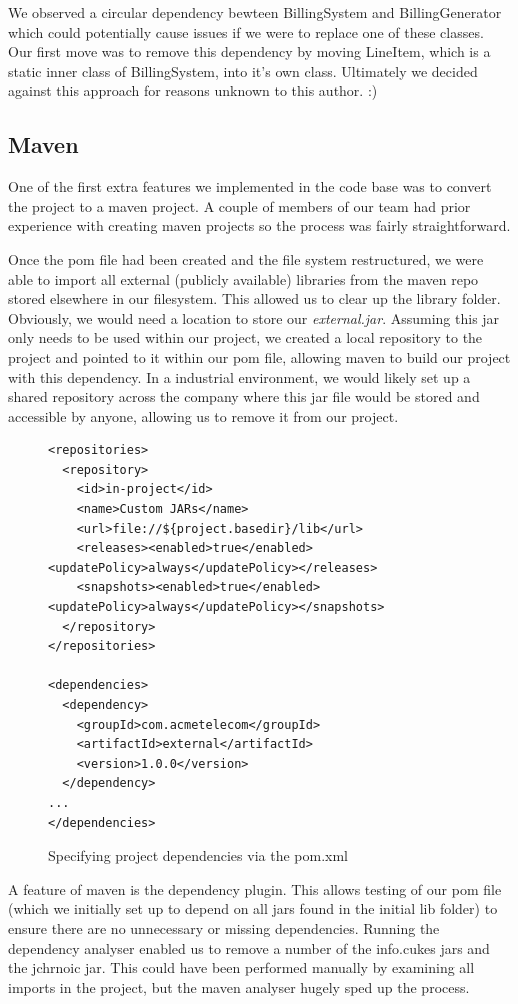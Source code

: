 \documentclass[a4paper]{article}
\begin{document}
We observed a circular dependency bewteen BillingSystem and BillingGenerator which
could potentially cause issues if we were to replace one of these classes. Our
first move was to remove this dependency by moving LineItem, which is a static inner class
of BillingSystem, into it's own class. Ultimately we decided against this approach
for reasons unknown to this author. :)


\subsection{Maven}

One of the first extra features we implemented in the code base was to
convert the project to a maven project. A couple of members of our team
had prior experience with creating maven projects so the process was fairly
straightforward. 

Once the pom file had been created and the file system restructured, we were
able to import all external (publicly available) libraries from the maven repo
stored elsewhere in our filesystem. This allowed us to clear up the library folder.
Obviously, we would need a location to store our \emph{external.jar}. Assuming this
jar only needs to be used within our project, we created a local repository to
the project and pointed to it within our pom file, allowing maven to build our
project with this dependency. In a industrial environment, we would likely set
up a shared repository across the company where this jar file would be stored
and accessible by anyone, allowing us to remove it from our project.

\begin{figure}[h]
\begin{verbatim}  
<repositories>
  <repository>
    <id>in-project</id>
    <name>Custom JARs</name>
    <url>file://${project.basedir}/lib</url>
    <releases><enabled>true</enabled><updatePolicy>always</updatePolicy></releases>
    <snapshots><enabled>true</enabled><updatePolicy>always</updatePolicy></snapshots>
  </repository>
</repositories>

<dependencies>
  <dependency>
    <groupId>com.acmetelecom</groupId>
    <artifactId>external</artifactId>
    <version>1.0.0</version>
  </dependency>
...
</dependencies>
\end{verbatim}
\caption{Specifying project dependencies via the pom.xml}
\end{figure}
A feature of maven is the dependency plugin. This allows testing of our pom file
(which we initially set up to depend on all jars found in the initial lib folder)
to ensure there are no unnecessary or missing dependencies. Running the
dependency analyser enabled us to remove a number of the info.cukes jars and
the jchrnoic jar. This could have been performed manually by examining all imports
in the project, but the maven analyser hugely sped up the process.
\end{document}
